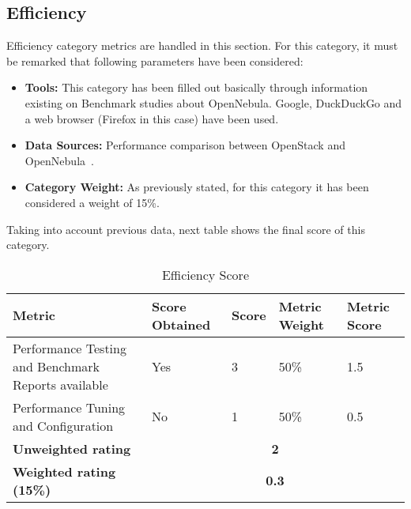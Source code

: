 \documentclass[11pt]{article}
\begin{document}
\subsection{Efficiency}
Efficiency category metrics are handled in this section. For this category, it must be remarked that following parameters have been considered:
\begin{itemize}\itemsep0pt
\item{\textbf{Tools:}} This category has been filled out basically through information existing on Benchmark studies about OpenNebula. Google, DuckDuckGo and a web browser (Firefox in this case) have been used.
\item{\textbf{Data Sources:}} Performance comparison between OpenStack and OpenNebula~\cite{BENCH00}.
\item{\textbf{Category Weight:}} As previously stated, for this category it has been considered a weight of 15\%.
\end{itemize}
Taking into account previous data, next table shows the final score of this category.
\begin{table}[H]
  \begin{center}
    \begin{tabular}{ | p{4cm} | p{3cm} | l | p{1.2cm} | p{1.2cm} | }
    \toprule
    \textbf{Metric} & \textbf{Score Obtained} & \textbf{Score} & \textbf{Metric Weight} & \textbf{Metric Score}\\
    \hline
    Performance Testing and Benchmark Reports available & Yes & 3 & 50\% & 1.5\\
    \hline
    Performance Tuning and Configuration & No & 1 & 50\% & 0.5\\
    \midrule
    \textbf{Unweighted rating} & \multicolumn{4}{c|}{\textbf{2}}\\
    \hline
    \textbf{Weighted rating (15\%)} & \multicolumn {4}{c|}{\textbf{0.3}}\\
    \bottomrule
    \end{tabular}
    \caption{Efficiency Score}
    \label{tab:effi_score}
  \end{center}
\end{table}
\end{document}
